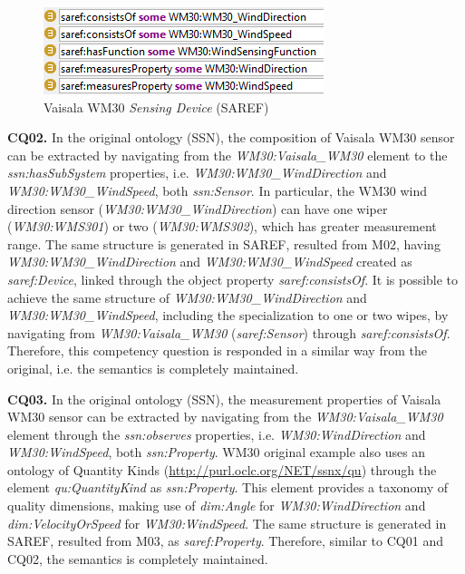 \documentclass{sig-alternate-05-2015}
\begin{document}
\begin{figure}[h!]
\centering
\includegraphics[scale=0.98]{SAREF_Sensor_WM30}
\caption{Vaisala WM30 \textit{Sensing Device} (SAREF)}
\label{fig:SAREF_Sensor_WM30}
\end{figure}

\textbf{CQ02.} In the original ontology (SSN), the composition of Vaisala WM30 sensor can be extracted by navigating from the \textit{WM30:Vaisala\_WM30} element to the \textit{ssn:hasSubSystem} properties, i.e. \textit{WM30:WM30\_WindDirection} and \textit{WM30:WM30\_WindSpeed}, both \textit{ssn:Sensor}. In particular, the WM30 wind direction sensor (\textit{WM30:WM30\_WindDirection}) can have one wiper (\textit{WM30:WMS301}) or two (\textit{WM30:WMS302}), which has greater measurement range. The same structure is generated in SAREF, resulted from M02, having \textit{WM30:WM30\_WindDirection} and \textit{WM30:WM30\_WindSpeed} created as \textit{saref:Device}, linked through the object property \textit{saref:consistsOf}. It is possible to achieve the same structure of \textit{WM30:WM30\_WindDirection} and \textit{WM30:WM30\_WindSpeed}, including the specialization to one or two wipes, by navigating from \textit{WM30:Vaisala\_WM30} (\textit{saref:Sensor}) through \textit{saref:consistsOf}. Therefore, this competency question is responded in a similar way from the original, i.e. the semantics is completely maintained.

\textbf{CQ03.} In the original ontology (SSN), the measurement properties of Vaisala WM30 sensor can be extracted by navigating from the \textit{WM30:Vaisala\_WM30} element through the \textit{ssn:observes} properties, i.e. \textit{WM30:WindDirection} and \textit{WM30:WindSpeed}, both \textit{ssn:Property}. WM30 original example also uses an ontology of Quantity Kinds (\url{http://purl.oclc.org/NET/ssnx/qu}) through the element \textit{qu:QuantityKind} as \textit{ssn:Property}. This element provides a taxonomy of quality dimensions, making use of \textit{dim:Angle} for \textit{WM30:WindDirection} and \textit{dim:VelocityOrSpeed} for \textit{WM30:WindSpeed}. The same structure is generated in SAREF, resulted from M03, as \textit{saref:Property}. Therefore, similar to CQ01 and CQ02, the semantics is completely maintained.
\end{document}
